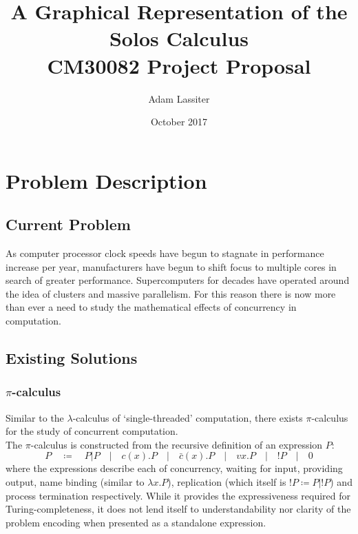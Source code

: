 \documentclass{article}
\title{A Graphical Representation of the Solos Calculus \\
	\large CM30082 Project Proposal}
\author{Adam Lassiter}
\date{October 2017}
\begin{document}
\maketitle

\vfill

\tableofcontents

\pagebreak


\section{Problem Description}
\subsection{Current Problem}
As computer processor clock speeds have begun to stagnate in performance increase per year, manufacturers have begun to shift focus to multiple cores in search of greater performance. Supercomputers for decades have operated around the idea of clusters and massive parallelism. For this reason there is now more than ever a need to study the mathematical effects of concurrency in computation.

\subsection{Existing Solutions}
\subsubsection{$\pi$-calculus}
Similar to the $\lambda$-calculus of `single-threaded' computation, there exists $\pi$-calculus for the study of concurrent computation.
\\
The $\pi$-calculus is constructed from the recursive definition of  an expression $P$:
\begin{equation*}
	P  \quad\coloneqq\quad  P|P  \quad|\quad  c(x).P  \quad|\quad  \bar{c}(x).P  \quad|\quad  vx.P  \quad|\quad  !P  \quad|\quad  0
\end{equation*}
where the expressions describe each of concurrency, waiting for input, providing output, name binding (similar to $\lambda x . P$), replication (which itself is $!P \coloneq P|!P$) and process termination respectively.
While it provides the expressiveness required for Turing-completeness, it does not lend itself to understandability nor clarity of the problem encoding when presented as a standalone expression.
\end{document}
